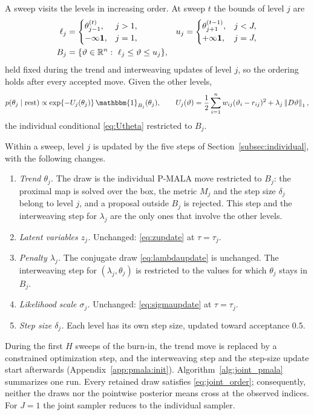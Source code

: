 A sweep visits the levels in increasing order. At sweep $t$ the bounds of level $j$ are
\begin{equation}
\begin{aligned}
    \ell_j &= \begin{cases}\theta_{j-1}^{(t)}, & j>1,\\ -\infty\mathbf 1, & j=1,\end{cases}
    & u_j &= \begin{cases}\theta_{j+1}^{(t-1)}, & j<J,\\ +\infty\mathbf 1, & j=J,\end{cases} \\
    B_j &= \{\vartheta\in\mathbb{R}^n:\ \ell_j\leq\vartheta\leq u_j\},
\end{aligned}
    \label{eq:joint_box}
\end{equation}
held fixed during the trend and interweaving updates of level $j$, so the ordering holds after every accepted move. Given the other levels,
\begin{equation}
    p(\theta_j \mid \text{rest}) \propto \exp\{-U_j(\theta_j)\}\,\mathbbm{1}_{B_j}(\theta_j), \qquad
    U_j(\vartheta) = \frac12\sum_{i=1}^n w_{ij}(\vartheta_i-r_{ij})^2 + \lambda_j\norm{D\vartheta}_1,
    \label{eq:joint_conditional}
\end{equation}
the individual conditional \eqref{eq:Utheta} restricted to $B_j$.

Within a sweep, level $j$ is updated by the five steps of Section~\ref{subsec:individual}, with the following changes.
\begin{enumerate}
    \item \emph{Trend $\theta_j$.} The draw is the individual P-MALA move restricted to $B_j$: the proximal map is solved over the box, the metric $M_j$ and the step size $\delta_j$ belong to level $j$, and a proposal outside $B_j$ is rejected. This step and the interweaving step for $\lambda_j$ are the only ones that involve the other levels.
    \item \emph{Latent variables $z_j$.} Unchanged: \eqref{eq:zupdate} at $\tau=\tau_j$.
    \item \emph{Penalty $\lambda_j$.} The conjugate draw \eqref{eq:lambdaupdate} is unchanged. The interweaving step for $(\lambda_j,\theta_j)$ is restricted to the values for which $\theta_j$ stays in $B_j$.
    \item \emph{Likelihood scale $\sigma_j$.} Unchanged: \eqref{eq:sigmaupdate} at $\tau=\tau_j$.
    \item \emph{Step size $\delta_j$.} Each level has its own step size, updated toward acceptance $0.5$.
\end{enumerate}
During the first $H$ sweeps of the burn-in, the trend move is replaced by a constrained optimization step, and the interweaving step and the step-size update start afterwards (Appendix~\ref{app:pmala:init}). Algorithm~\ref{alg:joint_pmala} summarizes one run. Every retained draw satisfies \eqref{eq:joint_order}; consequently, neither the draws nor the pointwise posterior means cross at the observed indices. For $J=1$ the joint sampler reduces to the individual sampler.

